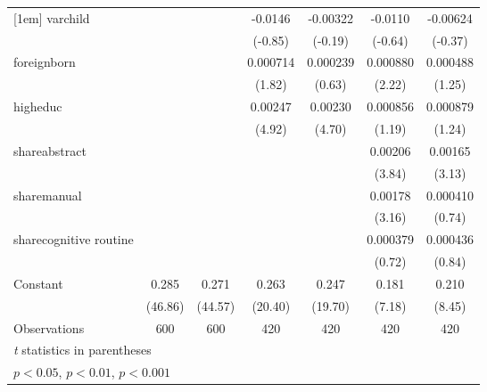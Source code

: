 \begin{table}[htbp]
\begin{tabular}{l*{6}{c}}
[1em]
varchild            &                     &                     &     -0.0146         &    -0.00322         &     -0.0110         &    -0.00624         \\
                    &                     &                     &     (-0.85)         &     (-0.19)         &     (-0.64)         &     (-0.37)         \\
[1em]
foreignborn         &                     &                     &    0.000714         &    0.000239         &    0.000880\sym{*}  &    0.000488         \\
                    &                     &                     &      (1.82)         &      (0.63)         &      (2.22)         &      (1.25)         \\
[1em]
higheduc            &                     &                     &     0.00247\sym{***}&     0.00230\sym{***}&    0.000856         &    0.000879         \\
                    &                     &                     &      (4.92)         &      (4.70)         &      (1.19)         &      (1.24)         \\
[1em]
shareabstract       &                     &                     &                     &                     &     0.00206\sym{***}&     0.00165\sym{**} \\
                    &                     &                     &                     &                     &      (3.84)         &      (3.13)         \\
[1em]
sharemanual         &                     &                     &                     &                     &     0.00178\sym{**} &    0.000410         \\
                    &                     &                     &                     &                     &      (3.16)         &      (0.74)         \\
[1em]
sharecognitive routine&                     &                     &                     &                     &    0.000379         &    0.000436         \\
                    &                     &                     &                     &                     &      (0.72)         &      (0.84)         \\
[1em]
Constant            &       0.285\sym{***}&       0.271\sym{***}&       0.263\sym{***}&       0.247\sym{***}&       0.181\sym{***}&       0.210\sym{***}\\
                    &     (46.86)         &     (44.57)         &     (20.40)         &     (19.70)         &      (7.18)         &      (8.45)         \\
\hline
Observations        &         600         &         600         &         420         &         420         &         420         &         420         \\
\hline\hline
\multicolumn{7}{l}{\footnotesize \textit{t} statistics in parentheses}\\
\multicolumn{7}{l}{\footnotesize \sym{*} \(p<0.05\), \sym{**} \(p<0.01\), \sym{***} \(p<0.001\)}\\
\end{tabular}
\end{table}
